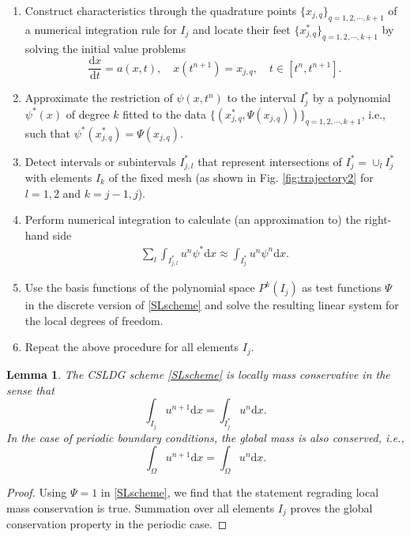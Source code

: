 \documentclass[letterpaper,10pt]{article}
\newtheorem{lemma}{Lemma}[section]
\numberwithin{equation}{section}
\numberwithin{figure}{section}
\numberwithin{table}{section}
\begin{document}
\begin{enumerate}
    \item Construct characteristics through the quadrature points $\{x_{j,q}\}_{q=1,2,\cdots,k+1}$ of a numerical integration rule for $I_j$ and
  locate their feet $\{x_{j,q}^*\}_{q=1,2,\cdots,k+1}$
  by solving the initial value problems
    $$
        \frac{\mathrm dx}{\mathrm dt}=a(x,t),\quad x(t^{n+1})=x_{j,q},\quad t\in[t^n,t^{n+1}].
    $$
    \item
    Approximate the restriction of $\psi(x,t^n)$ to the interval $I_j^*$
    by a polynomial $\psi^*(x)$ of degree $k$ fitted to
    the data $\{\left(x_{j,q}^*,\Psi(x_{j,q})\right)\}_{q=1,2,\cdots,k+1}$, i.e.,
    such that $\psi^*(x_{j,q}^*)=\Psi(x_{j,q})$.
    \item Detect intervals or subintervals $I_{j,l}^*$ that represent intersections 
    of $I_j^*=\cup_lI_j^*$ with elements $I_k$ of the fixed mesh (as shown in Fig.
    \ref{fig:trajectory2} for $l=1,2$ and $k=j-1,j$).
    \item Perform numerical integration to calculate
    (an approximation to) the right-hand side
    \begin{align}\label{rhsSL}
       \sum_l\int_{I_{j,l}^*}u^n\psi^*\mathrm dx\approx 
       \int_{I_j^*}u^n\psi^n\mathrm dx.
    \end{align}

    \item Use the basis functions of the polynomial space $P^k(I_{j})$ as test
    functions $\Psi$ in the discrete version of \eqref{SLscheme}
    and solve the resulting linear system for the local degrees of freedom.
    
    \item Repeat the above procedure for all elements $I_j$.
\end{enumerate}
\begin{lemma}
    The CSLDG scheme \eqref{SLscheme} is locally mass conservative in the sense that
    $$
        \int_{I_j}u^{n+1}\mathrm dx=\int_{I_j^*}u^n\mathrm dx.
    $$
    In the case of periodic boundary conditions, the global mass is also
    conserved, i.e.,
   $$
        \int_{\Omega}u^{n+1}\mathrm dx=\int_{\Omega}u^n\mathrm dx.
    $$
\end{lemma}
\begin{proof}
Using $\Psi=1$ in \eqref{SLscheme}, we find that the statement regrading local
mass conservation is true. Summation over all elements $I_j$ proves the
global conservation property in the periodic case.
\end{proof}
\end{document}
